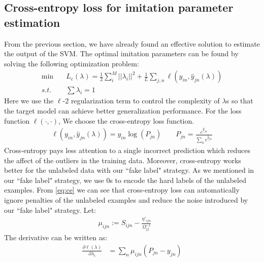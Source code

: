 \subsection{Cross-entropy loss for imitation parameter estimation}
From the previous section, we have already found an effective solution to estimate the output of the SVM. The optimal imitation parameters can be found by solving the following optimization problem:
\begin{equation}\label{eq:loo_loss}
\begin{aligned}
\min \quad& L_c\left(\lambda\right)=\frac{1}{2}\sum_i^M||\lambda_i||^2+\frac{1}{L}\sum_{j,n}\ell\left(y_{in},\hat{y}_{jn}\left(\lambda\right)\right)\\
s.t. \quad& \sum\lambda_i=1
\end{aligned}
\end{equation}
Here we use the $\ell$-2 regularization term to control the complexity of $\lambda$s so that the target model can achieve better generalization performance. For the loss function $\ell(\cdot,\cdot)$, We choose the cross-entropy loss function.
\begin{equation}\label{eq:ce}
\begin{aligned}
\ell\left(y_{in},\hat{y}_{jn}\left(\lambda\right)\right)=y_{in}\log(P_{jn}) \qquad
P_{jn} = \frac{e^{\hat{y}_{jn}}}{\sum_{h} e^{\hat{y}_{jh}}}
\end{aligned}
\end{equation}
Cross-entropy pays less attention to a single incorrect prediction which reduces the affect of the outliers in the training data. Moreover, cross-entropy works better for the unlabeled data with our ``fake label" strategy. As we mentioned in our ``fake label" strategy, we use 0s to encode the hard labels of the unlabeled examples. From \eqref{eq:ce} we can see that cross-entropy loss can automatically ignore penalties of the unlabeled examples and reduce the noise introduced by our ``fake label" strategy. 
Let:
\begin{equation}\label{eq:mu}
\begin{aligned}
\mu_{ijn}:=S_{ijn}-\frac{{\eta}'_{ijn}}{\Omega_{jj}^{-1}} \qquad
\end{aligned}
\end{equation}
The derivative can be written as:
\begin{equation}\label{eq:p}
\begin{aligned}
\frac{\partial \ell(\lambda)}{\partial \lambda_i}&=\sum_n\mu_{ijn}\left(P_{jn}-{y}_{jn}\right)
\end{aligned}
\end{equation}
